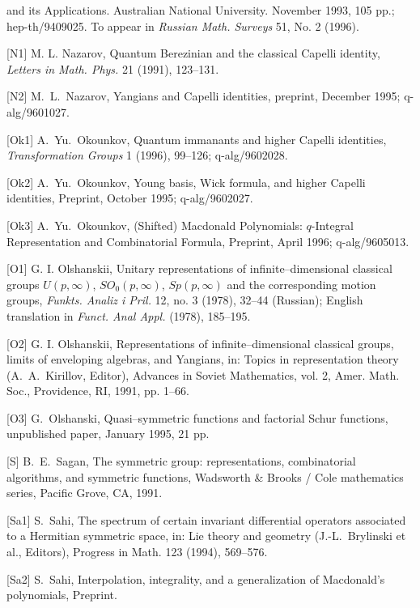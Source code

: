 and its Applications. Australian National University. November 1993, 
105 pp.; hep-th/9409025. To appear in {\it Russian Math. Surveys\/} 51,
No. 2 (1996).
\item{[N1]} {\smc M. L. Nazarov,}  
Quantum Berezinian and the classical Capelli identity,  
{\it Letters in Math. Phys.\/} 21 (1991), 123--131. 
\item{[N2]} {\smc M.~L.~Nazarov,} Yangians and Capelli identities,
preprint, December 1995; q-alg/9601027. 
\item{[Ok1]} {\smc A.~Yu.~Okounkov,} Quantum immanants and higher Capelli
identities, {\it Transformation Groups\/} 1 (1996), 99--126;
q-alg/9602028.
\item{[Ok2]} {\smc A.~Yu.~Okounkov,} Young basis, Wick formula, and higher
Capelli identities, Preprint, October 1995; q-alg/9602027.
\item{[Ok3]} {\smc A.~Yu.~Okounkov,} (Shifted) Macdonald Polynomials:
$q$-Integral Representation and Combinatorial Formula,
Preprint, April 1996; q-alg/9605013.
\item{[O1]} {\smc G. I. Olshanskii,}  
Unitary representations of infinite--dimensional classical grou\-ps  
$U(p,\infty)$, $SO_0(p,\infty)$, 
$Sp(p,\infty)$ and the corresponding motion groups,  
{\it Funkts. Analiz i 
Pril.\/} 12, no. 3 (1978), 32--44 (Russian); English translation in  
{\it Funct. Anal Appl.\/} (1978), 185--195. 
\item{[O2]} {\smc G. I. Olshanskii,}  
Representations of infinite--dimensional 
classical groups, limits of enveloping algebras, and Yangians, in: Topics 
in representation theory (A.~A.~Kirillov, Editor), Advances in Soviet 
Mathematics, vol. 2, Amer. Math. Soc., Providence, RI, 1991, pp. 1--66. 
\item{[O3]} {\smc G.~Olshanski,} Quasi--symmetric functions and factorial
Schur functions, unpublished paper, January 1995, 21 pp.
\item{[S]} {\smc B.~E.~Sagan,} The symmetric group: representations,  
combinatorial algorithms, and symmetric functions,  Wadsworth \& Brooks  
/ Cole mathematics series, Pacific Grove, CA, 1991.
\item{[Sa1]} {\smc S.~Sahi,} The spectrum of certain invariant differential
operators associated to a Hermitian symmetric space, in: Lie theory and
geometry (J.-L.~Brylinski et al., Editors), Progress in Math. 123 (1994),
569--576. 
\item{[Sa2]} {\smc S.~Sahi,} Interpolation, integrality, and a 
generalization of Macdonald's polynomials, Preprint.
